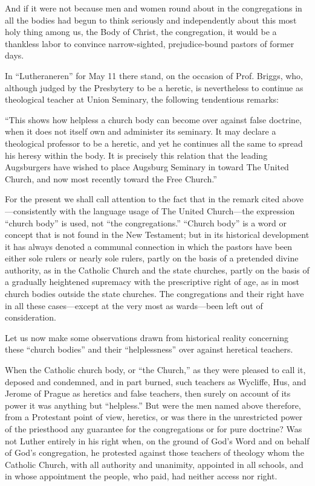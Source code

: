 And if it were not because men and women round about in the congregations in all the bodies had begun to think seriously and independently about this most holy thing among us, the Body of Christ, the congregation, it would be a thankless labor to convince narrow-sighted, prejudice-bound pastors of former days.

In “Lutheraneren” for May 11 there stand, on the occasion of Prof. Briggs, who, although judged by the Presbytery to be a heretic, is nevertheless to continue as theological teacher at Union Seminary, the following tendentious remarks:

“This shows how helpless a church body can become over against false doctrine, when it does not itself own and administer its seminary. It may declare a theological professor to be a heretic, and yet he continues all the same to spread his heresy within the body. It is precisely this relation that the leading Augsburgers have wished to place Augsburg Seminary in toward The United Church, and now most recently toward the Free Church.”

For the present we shall call attention to the fact that in the remark cited above—consistently with the language usage of The United Church—the expression “church body” is used, not “the congregations.” “Church body” is a word or concept that is not found in the New Testament; but in its historical development it has always denoted a communal connection in which the pastors have been either sole rulers or nearly sole rulers, partly on the basis of a pretended divine authority, as in the Catholic Church and the state churches, partly on the basis of a gradually heightened supremacy with the prescriptive right of age, as in most church bodies outside the state churches. The congregations and their right have in all these cases—except at the very most as wards—been left out of consideration.

Let us now make some observations drawn from historical reality concerning these “church bodies” and their “helplessness” over against heretical teachers.

When the Catholic church body, or “the Church,” as they were pleased to call it, deposed and condemned, and in part burned, such teachers as Wycliffe, Hus, and Jerome of Prague as heretics and false teachers, then surely on account of its power it was anything but “helpless.” But were the men named above therefore, from a Protestant point of view, heretics, or was there in the unrestricted power of the priesthood any guarantee for the congregations or for pure doctrine? Was not Luther entirely in his right when, on the ground of God’s Word and on behalf of God’s congregation, he protested against those teachers of theology whom the Catholic Church, with all authority and unanimity, appointed in all schools, and in whose appointment the people, who paid, had neither access nor right.

